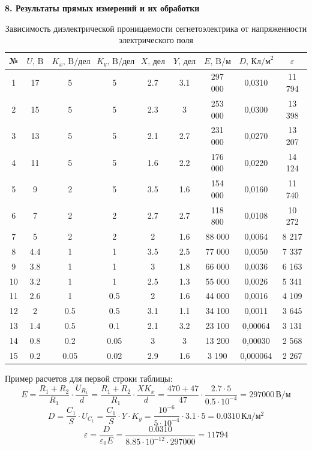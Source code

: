 \documentclass[12pt,fleqn]{article}
\begin{document}
\newpage


\begin{flushleft}
    \textbf{8. Результаты прямых измерений и их обработки} \\

    \begin{table}[h!]
    \centering
    \caption{Зависимость диэлектрической проницаемости сегнетоэлектрика от напряженности электрического поля}
    \begin{tabular}{|c|c|c|c|c|c|c|c|c|}
    \hline
    № & $U, \, \text{B}$ & $K_x, \, \text{B/дел}$ & $K_y, \, \text{B/дел}$ & $X, \, \text{дел}$ & $Y, \, \text{дел}$ & $E, \, \text{B/м}$ & $D, \, \text{Кл/м}^2$ & $\varepsilon$ \\
    \hline
    1 & 17 & 5 & 5 & 2.7 & 3.1 & 297 000 & 0,0310 & 11 794 \\
    \hline
    2 & 15 & 5 & 5 & 2.3 & 3 & 253 000 & 0,0300 & 13 398 \\
    \hline
    3 & 13 & 5 & 5 & 2.1 & 2.7 & 231 000 & 0,0270 & 13 207 \\
    \hline
    4 & 11 & 5 & 5 & 1.6 & 2.2 & 176 000 & 0,0220 & 14 124 \\
    \hline
    5 & 9 & 2 & 5 & 3.5 & 1.6 & 154 000 & 0,0160 & 11 740 \\
    \hline
    6 & 7 & 2 & 2 & 2.7 & 2.7 & 118 800 & 0,0108 & 10 272 \\
    \hline
    7 & 5 & 2 & 2 & 2 & 1.6 & 88 000 & 0,0064 & 8 217 \\
    \hline
    8 & 4.4 & 1 & 1 & 3.5 & 2.5 & 77 000 & 0,0050 & 7 337 \\
    \hline
    9 & 3.8 & 1 & 1 & 3 & 1.8 & 66 000 & 0,0036 & 6 163 \\
    \hline
    10 & 3.2 & 1 & 1 & 2.5 & 1.3 & 55 000 & 0,0026 & 5 341 \\
    \hline
    11 & 2.6 & 1 & 0.5 & 2 & 1.6 & 44 000 & 0,0016 & 4 109 \\
    \hline
    12 & 2 & 0.5 & 0.5 & 3.1 & 1.1 & 34 100 & 0,0011 & 3 645 \\
    \hline
    13 & 1.4 & 0.5 & 0.1 & 2.1 & 3.2 & 23 100 & 0,00064 & 3 131 \\
    \hline
    14 & 0.8 & 0.2 & 0.05 & 3 & 3 & 13 200 & 0,00030 & 2 568 \\
    \hline
    15 & 0.2 & 0.05 & 0.02 & 2.9 & 1.6 & 3 190 & 0,000064 & 2 267 \\
    \hline
    \end{tabular}
    \end{table}
    Пример расчетов для первой строки таблицы:
    \[ E = \frac{R_1 + R_2}{R_1} \cdot \frac{U_{R_1}}{d} = \frac{R_1 + R_2}{R_1} \cdot \frac{X K_x}{d} = \frac{470 + 47}{47} \cdot \frac{2.7 \cdot 5}{0.5 \cdot 10^{-4}} = 297000 \, \text{В}/\text{м} \]
    \[ D = \frac{C_1}{S} \cdot U_{C_1} = \frac{C_1}{S} \cdot Y \cdot K_y = \frac{10^{-6}}{5 \cdot 10^{-4}} \cdot 3.1 \cdot 5 = 0.0310 \, \text{Кл}/\text{м}^2 \]
    \[ \varepsilon = \frac{D}{\varepsilon_0 E} = \frac{0.0310}{8.85 \cdot 10^{-12} \cdot 297000} = 11 794 \] 
   
\end{flushleft}
\end{document}
